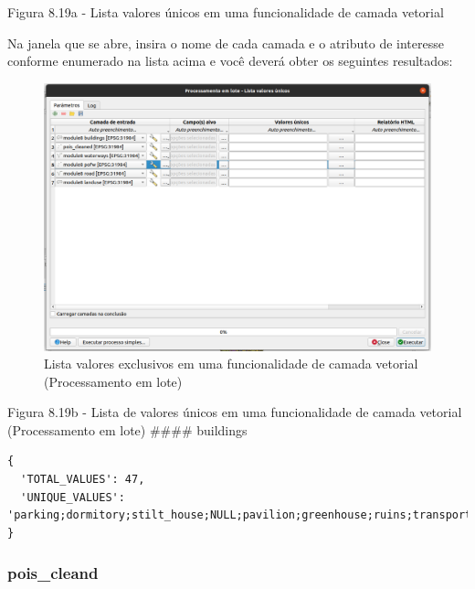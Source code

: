 \documentclass[
]{book}
\begin{document}
Figura 8.19a - Lista valores únicos em uma funcionalidade de camada vetorial

Na janela que se abre, insira o nome de cada camada e o atributo de interesse conforme enumerado na lista acima e você deverá obter os seguintes resultados:

\begin{figure}
\centering
\includegraphics{media/modulo8/fig819_b.png}
\caption{Lista valores exclusivos em uma funcionalidade de camada vetorial (Processamento em lote)}
\end{figure}

Figura 8.19b - Lista de valores únicos em uma funcionalidade de camada vetorial (Processamento em lote)
\#\#\#\# buildings

\begin{verbatim}
{
  'TOTAL_VALUES': 47,
  'UNIQUE_VALUES': 'parking;dormitory;stilt_house;NULL;pavilion;greenhouse;ruins;transportation;college;yes;chapel;boathouse;retail;supermarket;Prédio;college;industrial;farm;house;garages;garage;university;public;shed;roof;carport;church;temple;service;residential;hotel;warehouse;shop;cowshed;civic;kindergarten;stadium;apartments;semidetached_house;office;cabin;school;construction;commercial;terrace;grandstand;hospital;government'
}
\end{verbatim}

\hypertarget{pois_cleand}{%
\subsubsection{pois\_cleand}\label{pois_cleand}}
\end{document}
